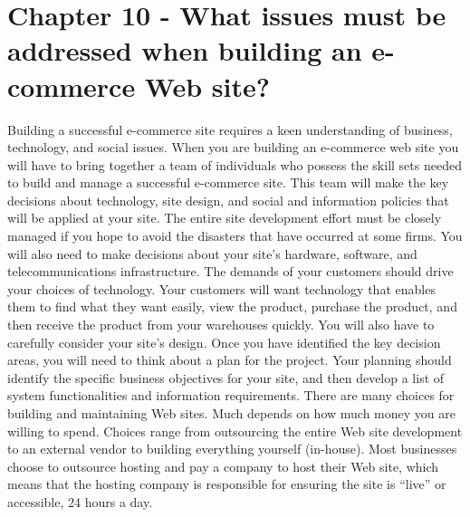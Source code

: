 \documentclass[12pt]{article}
\begin{document}
\section{Chapter 10 - What issues must be addressed when building an e-commerce Web site?}
Building a successful e-commerce site requires a keen understanding of business, technology, and social issues.
When you are building an e-commerce web site you will have to bring together a team of individuals who possess the skill sets needed to build and manage a successful e-commerce site. This team will make the key decisions about technology, site design, and social and information policies that will be applied at your site. The entire site development effort must be closely managed if you hope to avoid the disasters that have occurred at some firms. You will also need to make decisions about your site’s hardware, software, and telecommunications infrastructure. The demands of your customers should drive your choices of technology. Your customers will want technology that enables them to find what they want easily, view the product, purchase the product, and then receive the product from your warehouses quickly. You will also have to carefully consider your site’s design. Once you have identified the key decision areas, you will need to think about a plan for the project. Your planning should identify the specific business objectives for your site, and then develop a list of system functionalities and information requirements. There are many choices for building and maintaining Web sites. Much depends on how much money you are willing to spend. Choices range from outsourcing the entire Web site development to an external vendor to building everything yourself (in-house). Most businesses choose to outsource hosting and pay a company to host their Web site, which means that the hosting company is responsible for ensuring the site is “live” or accessible, 24 hours a day.
\end{document}
